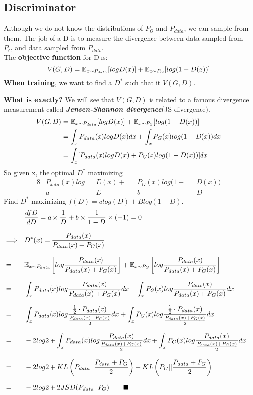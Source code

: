 \documentclass{../templates/ainote}
\begin{document}
\subsection{Discriminator}
Although we do not know the distributions of $P_G$ and $P_{data}$, we can sample from them.
The job of a  D is to measure the divergence between data sampled from $P_G$ and data sampled from $P_{data}$.\\
The \textbf{objective function} for D is:
\begin{equation}
\label{equ:objdis}
    V(G,D)=\mathbb{E}_{x\sim P_{data}}[logD(x)] + \mathbb{E}_{x\sim P_{G}}[log(1-D(x))]\\
\end{equation}
\textbf{When training}, we want to find a $D^\ast$ such that it  $V(G,D)$.
\begin{supp}
    \textbf{What is  exactly?}
    \spskip[1]
    We will see that $V(G,D)$ is related to a famous divergence measurement called \textbf{\textit{Jensen-Shannon divergence}}(JS divergence). 
    \spskip[1]
    \proof
    \begin{align*}
    \label{equ:jsdivproof}
        V(G,D)&=\mathbb{E}_{x\sim P_{data}}[logD(x)] + \mathbb{E}_{x\sim P_{G}}[log(1-D(x))]\\
        &=\int_x P_{data}(x)logD(x)dx + \int_x P_{G}(x)log(1-D(x))dx\\
        &=\int_x [P_{data}(x)logD(x) + P_{G}(x)log(1-D(x))]dx
    \end{align*}
    So given x, the optimal $D^\ast$ maximizing 
    \begin{alignat*}{8}
        &P_{data}(x)log&&D(x) + &&P_G(x)log(1-&&D(x)) \\
        &a             &&D      &&b           &&D
    \end{alignat*}
    \proofforward \quad Find $D^\ast$ maximizing $f(D)=alog(D)+Blog(1-D)$.
    \begin{alignat*}{5}
        &&&\frac{df{D}}{dD}=a\times \frac{1}{D}+b\times \frac{1}{1-D}\times (-1)=0&
        \spskip[0.5]
        &\Longrightarrow&&D^\ast (x)=\frac{P_{data}(x)}{P_{data}(x)+P_G(x)}&
        \spskip[0.5]
        &=&&\double{E}_{x\sim P_{data}}\left[ log\frac{P_{data}(x)}{P_{data}(x)+P_G(x)}\right]+\double{E}_{x\sim P_{G}}\left[ log\frac{P_{data}(x)}{P_{data}(x)+P_G(x)}\right]&
        \spskip[0.5]
        &=&&\int_x P_{data}(x)log\frac{P_{data}(x)}{P_{data}(x)+P_G(x)}dx+\int_x P_{G}(x)log\frac{P_{data}(x)}{P_{data}(x)+P_G(x)}dx&
        \spskip[0.5]
        &=&&\int_x P_{data}(x)log\frac{\frac{1}{2}\cdot P_{data}(x)}{\frac{P_{data}(x)+P_G(x)}{2}}dx+\int_x P_{G}(x)log\frac{\frac{1}{2}\cdot P_{data}(x)}{\frac{P_{data}(x)+P_G(x)}{2}}dx&
        \spskip[0.5]
        &=&&-2log2+\int_x P_{data}(x)log\frac{P_{data}(x)}{\frac{P_{data}(x)+P_G(x)}{2}}dx+\int_x P_{G}(x)log\frac{P_{data}(x)}{\frac{P_{data}(x)+P_G(x)}{2}}dx &
        \spskip[0.5]
        &=&&-2log2+KL\left( P_{data}||\frac{P_{data}+P_G}{2}\right)+KL\left( P_{G}||\frac{P_{data}+P_G}{2}\right)&
        \spskip[0.5]
        &=&&-2log2+2JSD(P_{data}||P_G) \qquad \blacksquare&
    \end{alignat*}
\end{supp}
\end{document}
